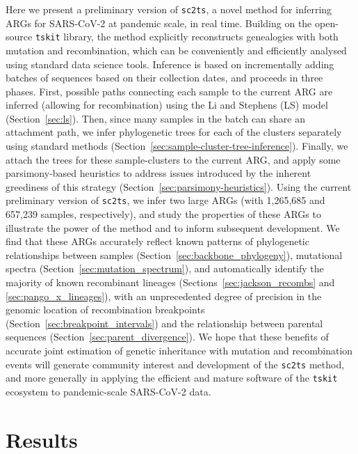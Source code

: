 \documentclass{article}
\begin{document}
Here we present a preliminary version of \texttt{sc2ts}, a novel method
for inferring ARGs for SARS-CoV-2 at pandemic scale, in real time.
Building on the open-source \texttt{tskit} library, the method 
explicitly reconstructs genealogies with both
mutation and recombination, which
can be conveniently and efficiently analysed using standard data science
tools. Inference is based on incrementally adding batches of sequences
based on their collection dates, and proceeds in three phases.
First, possible paths connecting each sample to the current ARG
are inferred (allowing for recombination) using the
Li and Stephens (LS) model (Section~\ref{sec:ls}). Then, since many samples
in the batch can share an attachment path,
we infer phylogenetic trees for each of the clusters separately using standard
methods (Section~\ref{sec:sample-cluster-tree-inference}).
Finally, we attach the trees for these sample-clusters to the current
ARG, and apply some parsimony-based heuristics to address issues
introduced by the inherent greediness of this strategy
(Section~\ref{sec:parsimony-heuristics}).
Using the current preliminary version of \texttt{sc2ts}, we infer two
large ARGs (with 1,265,685 and 657,239 samples, respectively), and study
the properties of these ARGs to illustrate the power of the method
and to inform subsequent development. We find that these
ARGs accurately reflect known patterns of phylogenetic relationships
between samples (Section~\ref{sec:backbone_phylogeny}),
mutational spectra (Section~\ref{sec:mutation_spectrum}),
and automatically identify the majority of known recombinant
lineages (Sections~\ref{sec:jackson_recombs} and \ref{sec:pango_x_lineages}),
with an unprecedented degree of precision in the
genomic location of recombination breakpoints
(Section~\ref{sec:breakpoint_intervals})
and the relationship between parental sequences
(Section~\ref{sec:parent_divergence}).
We hope that these benefits of accurate joint estimation of
genetic inheritance with mutation and recombination events will generate community
interest and development of the \texttt{sc2ts} method, and
more generally in applying the efficient and mature software
of the \texttt{tskit} ecosystem to pandemic-scale SARS-CoV-2 data.

\section{Results}
\end{document}
